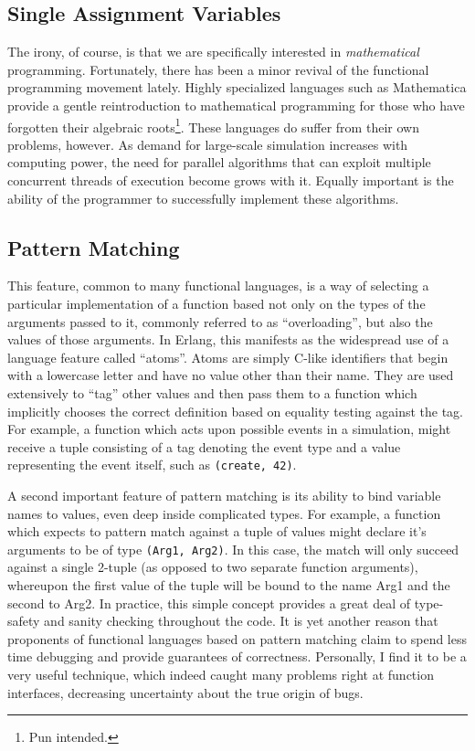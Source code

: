 \documentclass[twocolumn,a4paper,10pt]{article}
\begin{document}
\subsection{Single Assignment Variables}

The irony, of course, is that we are specifically interested in
\emph{mathematical} programming. Fortunately, there has been a minor revival of
the functional programming movement lately. Highly specialized languages such as
Mathematica provide a gentle reintroduction to mathematical programming for
those who have forgotten their algebraic roots\footnote{Pun intended.}. These
languages do suffer from their own problems, however. As demand for large-scale
simulation increases with computing power, the need for parallel algorithms that
can exploit multiple concurrent threads of execution become grows with it.
Equally important is the ability of the programmer to successfully implement
these algorithms.

\subsection{Pattern Matching}

This feature, common to many functional languages, is a way of selecting a
particular implementation of a function based not only on the types of the
arguments passed to it, commonly referred to as ``overloading'', but also the
values of those arguments. In Erlang, this manifests as the widespread use of a
language feature called ``atoms''. Atoms are simply C-like identifiers that
begin with a lowercase letter and have no value other than their name. They are
used extensively to ``tag'' other values and then pass them to a function which
implicitly chooses the correct  definition based on equality testing against the
tag.
For example, a function which acts upon possible events in a simulation,
might receive a tuple consisting of a tag denoting the event type and a value
representing the event itself, such as \texttt{(create, 42)}.

A second important feature of pattern matching is its ability to bind variable
names to values, even deep inside complicated types. For example, a function
which expects to pattern match against a tuple of values might declare it's
arguments to be of type \texttt{(Arg1, Arg2)}. In this case, the match will only
succeed against a single 2-tuple (as opposed to two separate function arguments),
whereupon the first value of the tuple will be bound to the name Arg1 and the
second to Arg2. In practice, this simple concept provides a great deal of
type-safety and sanity checking throughout the code. It is yet another reason
that proponents of functional languages based on pattern matching claim to spend
less time debugging and provide guarantees of correctness. Personally, I find it
to be a very useful technique, which indeed caught many problems right at
function interfaces, decreasing uncertainty about the true origin of bugs.
\end{document}
